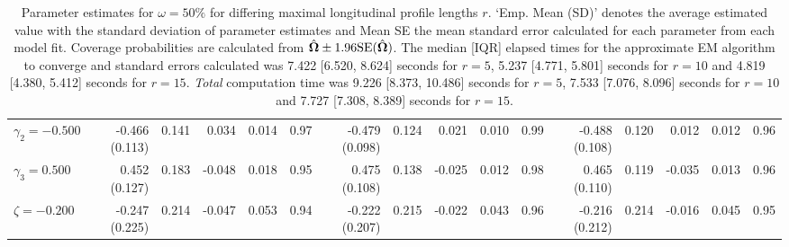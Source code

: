 \begin{landscape}
\begin{table}[ht]
\begin{tabular}{l|rrrrr:rrrrr:rrrrr}
  $\gamma_2=-0.500$ & -0.466 (0.113) & 0.141 &  0.034 & 0.014 & 0.97 & -0.479 (0.098) & 0.124 &  0.021 & 0.010 & 0.99 & -0.488 (0.108) & 0.120 &  0.012 & 0.012 & 0.96 \\ 
  $\gamma_3= 0.500$ &  0.452 (0.127) & 0.183 & -0.048 & 0.018 & 0.95 &  0.475 (0.108) & 0.138 & -0.025 & 0.012 & 0.98 &  0.465 (0.110) & 0.119 & -0.035 & 0.013 & 0.96 \\ 
  $\zeta=-0.200$ & -0.247 (0.225) & 0.214 & -0.047 & 0.053 & 0.94 & -0.222 (0.207) & 0.215 & -0.022 & 0.043 & 0.96 & -0.216 (0.212) & 0.214 & -0.016 & 0.045 & 0.95 \\ 
   \hline
\end{tabular}
\endgroup
\caption{Parameter estimates for $\omega=50\%$ for differing maximal longitudinal profile lengths $r$. `Emp. Mean (SD)' denotes the average estimated value with the standard deviation of parameter estimates and Mean SE the mean standard error calculated for each parameter from each model fit. Coverage probabilities are calculated from $\hat{\bm{\Omega}}\pm1.96\mathrm{SE}(\hat{\bm{\Omega}})$. The median [IQR] elapsed times for the approximate EM algorithm to converge and standard errors calculated was 7.422 [6.520, 8.624] seconds for $r=5$, 5.237 [4.771, 5.801] seconds for $r=10$ and 4.819 [4.380, 5.412] seconds for $r=15$. \textit{Total} computation time was 9.226 [8.373, 10.486] seconds for $r=5$, 7.533 [7.076, 8.096] seconds for $r=10$ and 7.727 [7.308, 8.389] seconds for $r=15$.} 
\end{table}
\vfill
\lscapepageno
\end{landscape}
\restoregeometry

